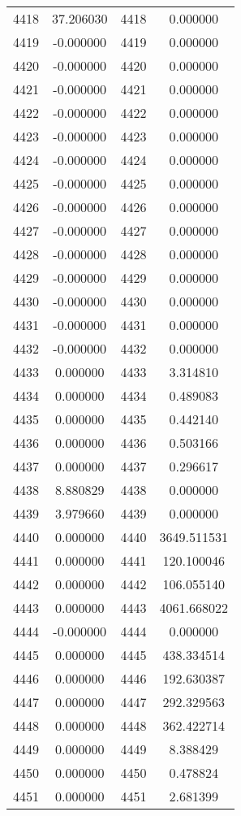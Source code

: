 \documentclass[12pt]{article}
\begin{document}
\begin{longtable}{@{}cccc@{}}
4418 & 37.206030 & 4418 & 0.000000 \\
4419 & -0.000000 & 4419 & 0.000000 \\
4420 & -0.000000 & 4420 & 0.000000 \\
4421 & -0.000000 & 4421 & 0.000000 \\
4422 & -0.000000 & 4422 & 0.000000 \\
4423 & -0.000000 & 4423 & 0.000000 \\
4424 & -0.000000 & 4424 & 0.000000 \\
4425 & -0.000000 & 4425 & 0.000000 \\
4426 & -0.000000 & 4426 & 0.000000 \\
4427 & -0.000000 & 4427 & 0.000000 \\
4428 & -0.000000 & 4428 & 0.000000 \\
4429 & -0.000000 & 4429 & 0.000000 \\
4430 & -0.000000 & 4430 & 0.000000 \\
4431 & -0.000000 & 4431 & 0.000000 \\
4432 & -0.000000 & 4432 & 0.000000 \\
4433 & 0.000000 & 4433 & 3.314810 \\
4434 & 0.000000 & 4434 & 0.489083 \\
4435 & 0.000000 & 4435 & 0.442140 \\
4436 & 0.000000 & 4436 & 0.503166 \\
4437 & 0.000000 & 4437 & 0.296617 \\
4438 & 8.880829 & 4438 & 0.000000 \\
4439 & 3.979660 & 4439 & 0.000000 \\
4440 & 0.000000 & 4440 & 3649.511531 \\
4441 & 0.000000 & 4441 & 120.100046 \\
4442 & 0.000000 & 4442 & 106.055140 \\
4443 & 0.000000 & 4443 & 4061.668022 \\
4444 & -0.000000 & 4444 & 0.000000 \\
4445 & 0.000000 & 4445 & 438.334514 \\
4446 & 0.000000 & 4446 & 192.630387 \\
4447 & 0.000000 & 4447 & 292.329563 \\
4448 & 0.000000 & 4448 & 362.422714 \\
4449 & 0.000000 & 4449 & 8.388429 \\
4450 & 0.000000 & 4450 & 0.478824 \\
4451 & 0.000000 & 4451 & 2.681399 \\

\end{longtable}
\end{document}
